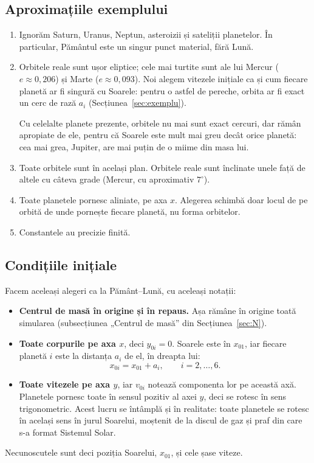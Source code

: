 \documentclass[11pt,a4paper]{article}
\begin{document}
\subsection*{Aproximațiile exemplului}
\begin{enumerate}[label=(S\arabic*)]
  \item Ignorăm Saturn, Uranus, Neptun, asteroizii și sateliții planetelor. În particular, Pământul este un singur punct material, fără Lună.
  \item Orbitele reale sunt ușor eliptice; cele mai turtite sunt ale lui Mercur ($e \approx 0{,}206$) și Marte ($e \approx 0{,}093$). Noi alegem vitezele inițiale ca și cum fiecare planetă ar fi singură cu Soarele: pentru o astfel de pereche, orbita ar fi exact un cerc de rază $a_i$ (Secțiunea~\ref{sec:exemplu}).

  Cu celelalte planete prezente, orbitele nu mai sunt exact cercuri, dar rămân apropiate de ele, pentru că Soarele este mult mai greu decât orice planetă: cea mai grea, Jupiter, are mai puțin de o miime din masa lui.
  \item Toate orbitele sunt în același plan. Orbitele reale sunt înclinate unele față de altele cu câteva grade (Mercur, cu aproximativ $7^\circ$).
  \item Toate planetele pornesc aliniate, pe axa $x$. Alegerea schimbă doar locul de pe orbită de unde pornește fiecare planetă, nu forma orbitelor.
  \item Constantele au precizie finită.
\end{enumerate}

\subsection*{Condițiile inițiale}
Facem aceleași alegeri ca la Pământ--Lună, cu aceleași notații:
\begin{itemize}
  \item \textbf{Centrul de masă în origine și în repaus.} Așa rămâne în origine toată simularea (subsecțiunea „Centrul de masă” din Secțiunea~\ref{sec:N}).
  \item \textbf{Toate corpurile pe axa $x$}, deci $y_{0i} = 0$. Soarele este în $x_{01}$, iar fiecare planetă $i$ este la distanța $a_i$ de el, în dreapta lui:
  \[
    x_{0i} = x_{01} + a_i, \qquad i = 2, \dots, 6 .
  \]
  \item \textbf{Toate vitezele pe axa $y$}, iar $v_{0i}$ notează componenta lor pe această axă. Planetele pornesc toate în sensul pozitiv al axei $y$, deci se rotesc în sens trigonometric. Acest lucru se întâmplă și în realitate: toate planetele se rotesc în același sens în jurul Soarelui, moștenit de la discul de gaz și praf din care s-a format Sistemul Solar.
\end{itemize}
Necunoscutele sunt deci poziția Soarelui, $x_{01}$, și cele șase viteze.
\end{document}
